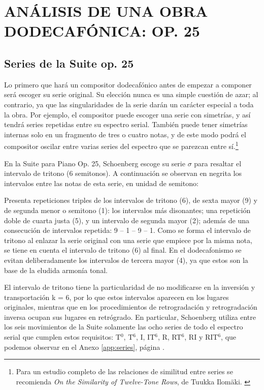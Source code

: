 \chapter{ANÁLISIS DE UNA OBRA DODECAFÓNICA: OP. 25}
\label{suitechapter}
	\section{Series de la Suite op. 25}
		Lo primero que hará un compositor dodecafónico antes de empezar a componer será escoger su serie original. Su elección nunca es una simple cuestión de azar; al contrario, ya que las singularidades de la serie darán un carácter especial a toda la obra. Por ejemplo, el compositor puede escoger una serie con simetrías, y así tendrá series repetidas entre su espectro serial. También puede tener simetrías internas solo en un fragmento de tres o cuatro notas, y de este modo podrá el compositor oscilar entre varias series del espectro que se parezcan entre sí.\footnote{Para un estudio completo de las relaciones de similitud entre series se recomienda \emph{On the Similarity of Twelve-Tone Rows}, de Tuukka Ilomäki. \cite{ilomaki}}
		
		En la Suite para Piano Op. 25, Schoenberg escoge su serie $\sigma$ para resaltar el intervalo de tritono (6 semitonos). A continuación se observan en negrita los intervalos entre las notas de esta serie, en unidad de semitono:
		
				
		Presenta repeticiones triples de los intervalos de tritono (6), de sexta mayor (9) y de segunda menor o semitono (1): los intervalos más disonantes; una repetición doble de cuarta justa (5), y un intervalo de segunda mayor (2); además de una consecución de intervalos repetida: 9 -- 1 -- 9 -- 1. Como se forma el intervalo de tritono al enlazar la serie original con una serie que empiece por la misma nota, se tiene en cuenta el intervalo de tritono (6) al final. En el dodecafonismo se evitan deliberadamente los intervalos de tercera mayor (4), ya que estos son la base de la eludida armonía tonal. \label{serie25}
		
		El intervalo de tritono tiene la particularidad de no modificarse en la inversión y transportación k = 6, por lo que estos intervalos aparecen en los lugares originales, mientras que en los procedimientos de retrogradación y retrogradación inversa ocupan sus lugares en retrógrado. En particular, Schoenberg utiliza entre los seis movimientos de la Suite solamente las ocho series de todo el espectro serial que cumplen estos requisitos: T$^0$, T$^6$, I, IT$^6$, R, RT$^6$, RI y RIT$^6$, que podemos observar en el Anexo \ref{app:series}, página \pageref{app:series}.
		
